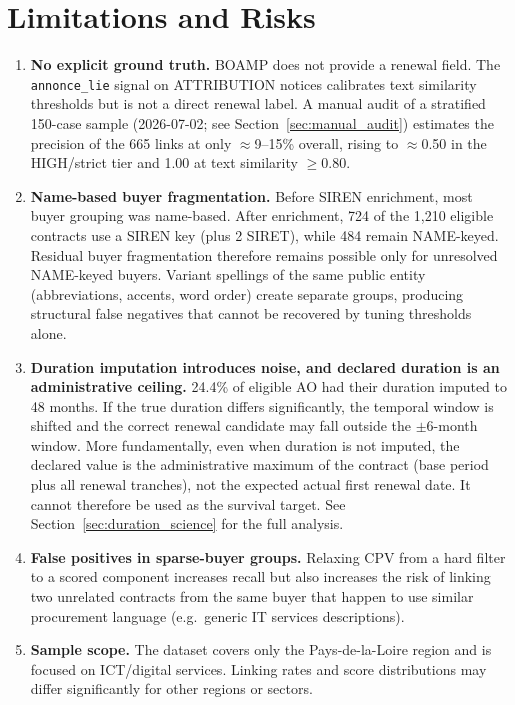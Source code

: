 \documentclass[12pt, a4paper]{article}
\begin{document}
\section{Limitations and Risks}

\begin{enumerate}[leftmargin=*, label=\textbf{L\arabic*.}]

  \item \textbf{No explicit ground truth.} BOAMP does not provide a renewal
        field. The \texttt{annonce\_lie} signal on ATTRIBUTION notices
        calibrates text similarity thresholds but is not a direct renewal label.
        A manual audit of a stratified 150-case sample (2026-07-02; see
        Section~\ref{sec:manual_audit}) estimates the precision of the 665
        links at only $\approx$9--15\% overall, rising to $\approx$0.50 in the
        HIGH/strict tier and 1.00 at text similarity $\geq 0.80$.

  \item \textbf{Name-based buyer fragmentation.} Before SIREN enrichment, most buyer grouping was name-based. After enrichment, 724 of the 1,210 eligible contracts use a SIREN key (plus 2 SIRET), while 484 remain NAME-keyed. Residual buyer fragmentation therefore remains possible only for unresolved NAME-keyed buyers. Variant spellings of the same public entity (abbreviations,
        accents, word order) create separate groups, producing structural false
        negatives that cannot be recovered by tuning thresholds alone.

  \item \textbf{Duration imputation introduces noise, and declared duration is
        an administrative ceiling.} 24.4\% of eligible AO had their duration
        imputed to 48 months. If the true duration differs significantly, the
        temporal window is shifted and the correct renewal candidate may fall
        outside the $\pm$6-month window. More fundamentally, even when duration
        is not imputed, the declared value is the administrative maximum of the
        contract (base period plus all renewal tranches), not the expected actual
        first renewal date. It cannot therefore be used as the survival target.
        See Section~\ref{sec:duration_science} for the full analysis.

  \item \textbf{False positives in sparse-buyer groups.} Relaxing CPV from a
        hard filter to a scored component increases recall but also increases the
        risk of linking two unrelated contracts from the same buyer that happen to
        use similar procurement language (e.g.\ generic IT services descriptions).

  \item \textbf{Sample scope.} The dataset covers only the Pays-de-la-Loire
        region and is focused on ICT/digital services. Linking rates and score
        distributions may differ significantly for other regions or sectors.

\end{enumerate}
\end{document}
